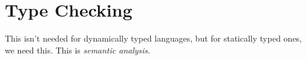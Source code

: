 \section{Type Checking} 

  This isn't needed for dynamically typed languages, but for statically typed ones, we need this. This is \textit{semantic analysis}. 
